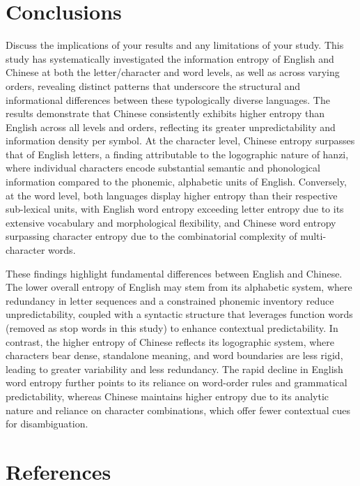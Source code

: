 \documentclass[12pt]{article}
\begin{document}
\section*{\centering Conclusions}
Discuss the implications of your results and any limitations of your study.
This study has systematically investigated the information entropy of English and Chinese at both the letter/character and word levels, as well as across varying orders, revealing distinct patterns that underscore the structural and informational differences between these typologically diverse languages. The results demonstrate that Chinese consistently exhibits higher entropy than English across all levels and orders, reflecting its greater unpredictability and information density per symbol. At the character level, Chinese entropy surpasses that of English letters, a finding attributable to the logographic nature of hanzi, where individual characters encode substantial semantic and phonological information compared to the phonemic, alphabetic units of English. Conversely, at the word level, both languages display higher entropy than their respective sub-lexical units, with English word entropy exceeding letter entropy due to its extensive vocabulary and morphological flexibility, and Chinese word entropy surpassing character entropy due to the combinatorial complexity of multi-character words.

These findings highlight fundamental differences between English and Chinese. The lower overall entropy of English may stem from its alphabetic system, where redundancy in letter sequences and a constrained phonemic inventory reduce unpredictability, coupled with a syntactic structure that leverages function words (removed as stop words in this study) to enhance contextual predictability. In contrast, the higher entropy of Chinese reflects its logographic system, where characters bear dense, standalone meaning, and word boundaries are less rigid, leading to greater variability and less redundancy. The rapid decline in English word entropy further points to its reliance on word-order rules and grammatical predictability, whereas Chinese maintains higher entropy due to its analytic nature and reliance on character combinations, which offer fewer contextual cues for disambiguation.
\section*{\centering References}




\end{document}

